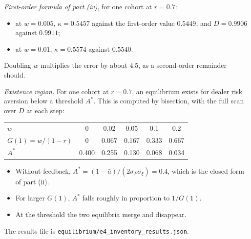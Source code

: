 \emph{First-order formula of part (iv)}, for one cohort at $r=0.7$:
\begin{itemize}[itemsep=1pt,topsep=2pt]
\item at $w=0.005$, $\kappa=0.5457$ against the first-order value $0.5449$, and $D=0.9906$ against $0.9911$;
\item at $w=0.01$, $\kappa=0.5574$ against $0.5540$.
\end{itemize}
Doubling $w$ multiplies the error by about $4.5$, as a second-order remainder should.

\emph{Existence region.} For one cohort at $r=0.7$, an equilibrium exists for dealer risk aversion below a threshold $A^*$. This is computed by bisection, with the full scan over $D$ at each step:
\begin{center}\small
\begin{tabular}{lccccc}
\hline
$w$ & 0 & 0.02 & 0.05 & 0.1 & 0.2\\
$G(1)=w/(1-r)$ & 0 & 0.067 & 0.167 & 0.333 & 0.667\\
$A^*$ & 0.400 & 0.255 & 0.130 & 0.068 & 0.034\\
\hline
\end{tabular}
\end{center}
\begin{itemize}[itemsep=1pt,topsep=2pt]
\item Without feedback, $A^*=(1-\bar a)/(2\sigma_F\sigma_\xi)=0.4$, which is the closed form of part (ii).
\item For larger $G(1)$, $A^*$ falls roughly in proportion to $1/G(1)$.
\item At the threshold the two equilibria merge and disappear.
\end{itemize}
The results file is \nolinkurl{equilibrium/e4_inventory_results.json}.


